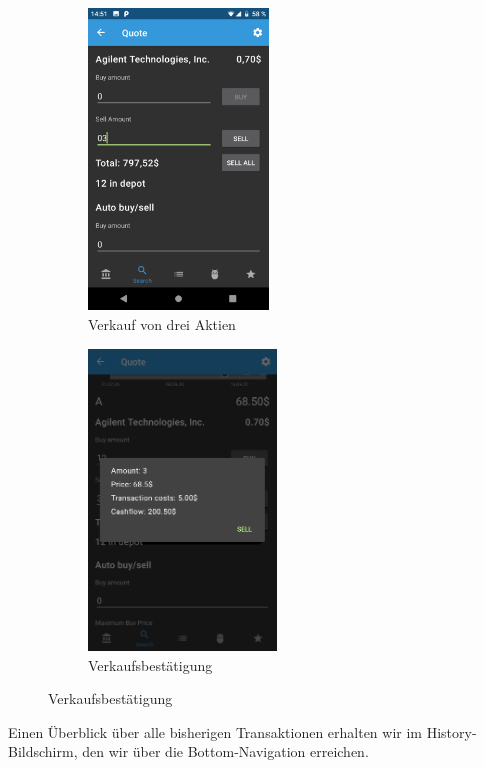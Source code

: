 \documentclass[a4paper]{article}
\begin{document}
\begin{figure}[H]
	\begin{subfigure}{.5\textwidth}
		\centering
		\includegraphics[height=8cm,keepaspectratio]{./images/demo/sell.png}
		\caption{Verkauf von drei Aktien}
		\label{fig:demo:sell_a}
	\end{subfigure}
	\begin{subfigure}{.5\textwidth}
		\centering
		\includegraphics[height=8cm,keepaspectratio]{./images/demo/sell_a_confirmation.png}
		\caption{Verkaufsbestätigung}
		\label{fig:demo:sell_a_confirmation}
	\end{subfigure}
\end{figure}

Einen Überblick über alle bisherigen Transaktionen erhalten wir im History-Bildschirm, den wir über die Bottom-Navigation erreichen. 
\end{document}
